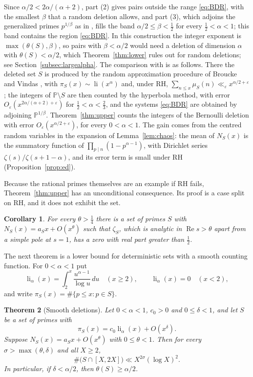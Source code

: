 \documentclass[11pt]{amsart}
\newtheorem{theorem}{Theorem}
\newtheorem{corollary}[theorem]{Corollary}
\theoremstyle{remark}
\numberwithin{equation}{section}
\newcommand{\PP}{\mathbb{P}}
\newcommand{\eps}{\varepsilon}
\DeclareMathOperator{\re}{Re}
\DeclareMathOperator{\li}{li}
\begin{document}
Since $\alpha/2<2\alpha/(\alpha+2)$, part (2) gives pairs outside the range \eqref{eq:BDR}, with the smallest $\beta$ that a random deletion allows, and part (3), which adjoins the generalized primes $p^{1/\beta}$ as in \cite{BDR}, fills the band $\alpha/2\le\beta<\tfrac12$ for every $\tfrac12<\alpha<1$; this band contains the region \eqref{eq:BDR}. In this construction the integer exponent is $\max(\theta(S),\beta)$, so pairs with $\beta<\alpha/2$ would need a deletion of dimension $\alpha$ with $\theta(S)<\alpha/2$, which Theorem~\ref{thm:lower} rules out for random deletions; see Section~\ref{subsec:largealpha}. The comparison with \cite[\S5]{BDR} is as follows. There the deleted set $S$ is produced by the random approximation procedure of Broucke and Vindas \cite{BV}, with $\pi_S(x)\sim\li(x^{\alpha})$ and, under RH, $\sum_{n\le x}\mu_S(n)\ll_\eps x^{\alpha/2+\eps}$; the integers of $\PP\setminus S$ are then counted by the hyperbola method, with error $O_\eps(x^{2\alpha/(\alpha+2)+\eps})$ for $\tfrac12<\alpha<\tfrac23$, and the systems \eqref{eq:BDR} are obtained by adjoining $\PP^{1/\beta}$. Theorem~\ref{thm:upper} counts the integers of the Bernoulli deletion with error $O_\eps(x^{\alpha/2+\eps})$, for every $0<\alpha<1$. The gain comes from the centred random variables in the expansion of Lemma~\ref{lem:chaos}: the mean of $N_S(x)$ is the summatory function of $\prod_{p\mid n}(1-p^{\alpha-1})$, with Dirichlet series $\zeta(s)/\zeta(s+1-\alpha)$, and its error term is small under RH (Proposition~\ref{prop:ed}).

Because the rational primes themselves are an example if RH fails, Theorem~\ref{thm:upper} has an unconditional consequence. Its proof is a case split on RH, and it does not exhibit the set.

\begin{corollary}\label{cor:quarter}
For every $\theta>\tfrac14$ there is a set of primes $S$ with $N_S(x)=a_Sx+O(x^{\theta})$ such that $\zeta_S$, which is analytic in $\re s>\theta$ apart from a simple pole at $s=1$, has a zero with real part greater than $\tfrac12$.
\end{corollary}

The next theorem is a lower bound for deterministic sets with a smooth counting function. For $0<\alpha<1$ put
\[
\li_\alpha(x)=\int_2^x\frac{u^{\alpha-1}}{\log u}\,du\quad(x\ge2),\qquad \li_\alpha(x)=0\quad(x<2),
\]
and write $\pi_S(x)=\#\{p\le x:p\in S\}$.

\begin{theorem}[Smooth deletions]\label{thm:smooth}
Let $0<\alpha<1$, $c_0>0$ and $0\le\delta<1$, and let $S$ be a set of primes with
\[
\pi_S(x)=c_0\li_\alpha(x)+O(x^{\delta}).
\]
Suppose $N_S(x)=a_Sx+O(x^{\theta})$ with $0\le\theta<1$. Then for every $\sigma>\max(\theta,\delta)$ and all $X\ge2$,
\begin{equation}\label{eq:smoothcount}
\#\bigl(S\cap[X,2X]\bigr)\ll X^{2\sigma}(\log X)^2 .
\end{equation}
In particular, if $\delta<\alpha/2$, then $\theta(S)\ge\alpha/2$.
\end{theorem}
\end{document}
